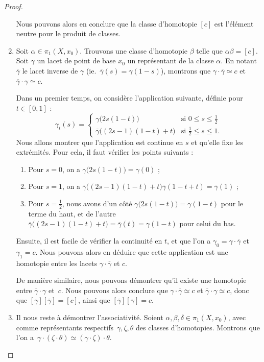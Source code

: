 \begin{proof}
\begin{enumerate}
    Nous pouvons alors en conclure que la classe d'homotopie $[c]$ est l'élément neutre pour le produit de classes.
    \item Soit $\alpha\in\pi_1(X,x_0)$. Trouvons une classe d'homotopie $\beta$ telle que $\alpha\beta=[c]$. Soit $\gamma$ un lacet de point de base $x_0$ un représentant de la classe $\alpha$. En notant $\overline{\gamma}$ le lacet inverse de $\gamma$ (ie.~${\overline{\gamma}(s)=\gamma(1-s)}$), montrons que $\gamma\cdot\overline{\gamma}\simeq c$ et $\overline{\gamma}\cdot\gamma\simeq c$.

    \bigskip Dans un premier temps, on considère l'application suivante, définie pour $t\in[0,1]$ : \[\gamma_t(s)=\left\{\begin{matrix}
    \gamma\big(2s(1-t)\big)&\text{si }0\leq s\leq \frac{1}{2}\\ 
    \overline{\gamma}\big((2s-1)(1-t)+t\big)&\text{si }\frac{1}{2}\leq s\leq 1.
    \end{matrix}\right.\]Nous allons montrer que l'application est continue en $s$ et qu'elle fixe les extrémités. Pour cela, il faut vérifier les points suivants : \begin{enumerate}
        \item Pour $s=0$, on a $\gamma\big(2s(1-t)\big)=\gamma(0)$ ;
        \item Pour $s=1$, on a $\overline{\gamma}\big((2s-1)(1-t)+t\big)\overline{\gamma}(1-t+t)=\overline{\gamma}(1)$ ; 
        \item Pour $s=\frac{1}{2}$, nous avons d'un côté $\gamma\big(2s(1-t)\big)=\gamma(1-t)$ pour le terme du haut, et de l'autre~${\overline{\gamma}\big((2s-1)(1-t)+t\big)=\overline{\gamma}(t)=\gamma(1-t)}$ pour celui du bas.
    \end{enumerate} Ensuite, il est facile de vérifier la continuité en $t$, et que l'on a $\gamma_0=\gamma\cdot\overline{\gamma}$ et $\gamma_1=c$. Nous pouvons alors en déduire que cette application est une homotopie entre les lacets $\gamma\cdot\overline{\gamma}$ et $c$.

    \bigskip De manière similaire, nous pouvons démontrer qu'il existe une homotopie entre $\overline{\gamma}\cdot\gamma$ et~$c$. Nous pouvons alors conclure que $\gamma\cdot\overline{\gamma}\simeq c$ et $\overline{\gamma}\cdot\gamma\simeq c$, donc que $[\gamma][\overline{\gamma}]=[c]$, ainsi que $[\overline{\gamma}][\gamma]=c$.
    \item Il nous reste à démontrer l'associativité. Soient $\alpha,\beta,\delta\in\pi_1(X,x_0)$, avec comme représentants respectifs~$\gamma,\zeta,\theta$ des classes d'homotopies. Montrons que l'on a~$\gamma\cdot(\zeta\cdot\theta)\simeq(\gamma\cdot\zeta)\cdot\theta$.


\end{enumerate}
\end{proof}
